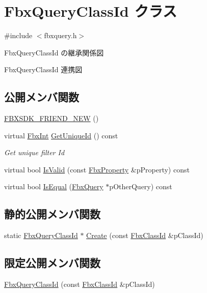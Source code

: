 \hypertarget{class_fbx_query_class_id}{}\section{Fbx\+Query\+Class\+Id クラス}
\label{class_fbx_query_class_id}


{\ttfamily \#include $<$fbxquery.\+h$>$}



Fbx\+Query\+Class\+Id の継承関係図


Fbx\+Query\+Class\+Id 連携図
\subsection*{公開メンバ関数}
\begin{DoxyCompactItemize}
\item 
\hyperlink{class_fbx_query_class_id_a2693a06ca55fe4fdd0bf3dacc986be0f}{F\+B\+X\+S\+D\+K\+\_\+\+F\+R\+I\+E\+N\+D\+\_\+\+N\+EW} ()
\item 
virtual \hyperlink{fbxtypes_8h_a088fa96de3b0b3ea69f0f6afef525dfb}{Fbx\+Int} \hyperlink{class_fbx_query_class_id_a9460258f2525b83b7e81f87a3bcc2c61}{Get\+Unique\+Id} () const
\begin{DoxyCompactList}\small\item\em Get unique filter Id \end{DoxyCompactList}\item 
virtual bool \hyperlink{class_fbx_query_class_id_aaa9990771cab43ddc199eaeac2b6d754}{Is\+Valid} (const \hyperlink{class_fbx_property}{Fbx\+Property} \&p\+Property) const
\item 
virtual bool \hyperlink{class_fbx_query_class_id_ac20046270f87a7bb84fbf776980431af}{Is\+Equal} (\hyperlink{class_fbx_query}{Fbx\+Query} $\ast$p\+Other\+Query) const
\end{DoxyCompactItemize}
\subsection*{静的公開メンバ関数}
\begin{DoxyCompactItemize}
\item 
static \hyperlink{class_fbx_query_class_id}{Fbx\+Query\+Class\+Id} $\ast$ \hyperlink{class_fbx_query_class_id_a8627c647cbb20945d7baf91e37c826f1}{Create} (const \hyperlink{class_fbx_class_id}{Fbx\+Class\+Id} \&p\+Class\+Id)
\end{DoxyCompactItemize}
\subsection*{限定公開メンバ関数}
\begin{DoxyCompactItemize}
\item 
\hyperlink{class_fbx_query_class_id_adae8384b1b8f0853e84d4ff85509f27b}{Fbx\+Query\+Class\+Id} (const \hyperlink{class_fbx_class_id}{Fbx\+Class\+Id} \&p\+Class\+Id)
\end{DoxyCompactItemize}



